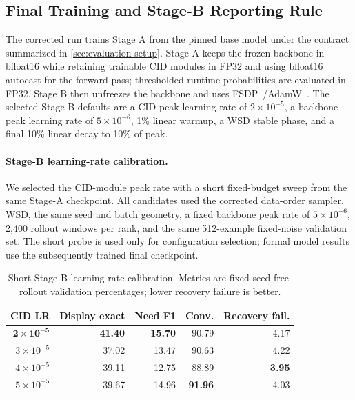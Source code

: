 \subsection{Final Training and Stage-B Reporting Rule}

The corrected run trains Stage A from the pinned base model under the contract summarized in
\cref{sec:evaluation-setup}. Stage A keeps
the frozen backbone in bfloat16 while retaining trainable CID modules in FP32 and using bfloat16
autocast for the forward pass; thresholded runtime probabilities are evaluated in FP32. Stage B then
unfreezes the backbone and uses FSDP~\citep{zhao2023fsdp}/AdamW~\citep{loshchilov2019adamw}. The selected Stage-B defaults are a CID peak learning rate of $2\times10^{-5}$, a backbone peak learning rate of $5\times10^{-6}$, 1\% linear warmup, a WSD stable phase, and a final 10\% linear decay to 10\% of peak.

\paragraph{Stage-B learning-rate calibration.}
We selected the CID-module peak rate with a short fixed-budget sweep from the same Stage-A checkpoint. All candidates used the corrected data-order sampler, WSD, the same seed and batch geometry, a fixed backbone peak rate of $5\times10^{-6}$, 2,400 rollout windows per rank, and the same 512-example fixed-noise validation set. The short probe is used only for configuration selection; formal model results use the subsequently trained final checkpoint.

\begin{table}[t]
  \centering
  \footnotesize
  \setlength{\tabcolsep}{3.0pt}
  \begin{tabular}{rrrrr}
    \toprule
    CID LR & Display exact & Need F1 & Conv. & Recovery fail. \\
    \midrule
    $\mathbf{2\times10^{-5}}$ & \textbf{41.40} & \textbf{15.70} & 90.79 & 4.17 \\
    $3\times10^{-5}$ & 37.02 & 13.47 & 90.63 & 4.22 \\
    $4\times10^{-5}$ & 39.11 & 12.75 & 88.89 & \textbf{3.95} \\
    $5\times10^{-5}$ & 39.67 & 14.96 & \textbf{91.96} & 4.03 \\
    \bottomrule
  \end{tabular}
  \caption{Short Stage-B learning-rate calibration. Metrics are fixed-seed free-rollout validation percentages; lower recovery failure is better.}
  \label{tab:stageb-lr-sweep}
\end{table}

